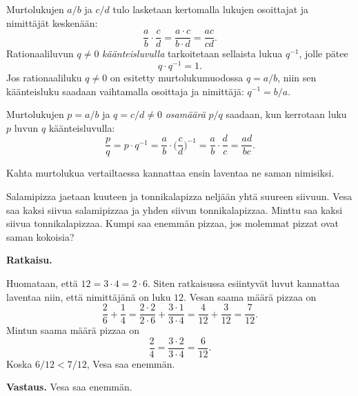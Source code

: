 Murtolukujen $a/b$ ja $c/d$ tulo lasketaan kertomalla lukujen osoittajat ja nimittäjät keskenään:
\[
\frac{a}{b}\cdot \frac{c}{d} = \frac{a\cdot c}{b\cdot d} = \frac{ac}{cd}.
\]
Rationaaliluvun $q\neq 0$ \emph{käänteisluvulla} tarkoitetaan sellaista lukua $q^{-1}$, jolle pätee
\[
q\cdot q^{-1} = 1.
\]
Jos rationaaliluku $q\neq 0$ on esitetty murtolukumuodossa $q=a/b$, niin sen käänteisluku saadaan vaihtamalla osoittaja ja nimittäjä: $q^{-1} = b/a$.

Murtolukujen $p=a/b$ ja $q=c/d\neq 0$ \emph{osamäärä} $p/q$ saadaan, kun kerrotaan luku $p$ luvun $q$ käänteisluvulla:
\[
\frac{p}{q} = p\cdot q^{-1} = \frac{a}{b}\cdot\Big(\frac{c}{d}\Big)^{-1} = \frac{a}{b}\cdot \frac{d}{c}
= \frac{ad}{bc}.
\]




Kahta murtolukua vertailtaessa kannattaa ensin laventaa ne saman nimisiksi.

\begin{esimerkki}
Salamipizza jaetaan kuuteen ja tonnikalapizza neljään yhtä suureen siivuun. Vesa saa kaksi siivua salamipizzaa ja yhden siivun tonnikalapizzaa. Minttu saa kaksi siivua tonnikalapizzaa. Kumpi saa enemmän pizzaa, jos molemmat pizzat ovat saman kokoisia?

{\bf Ratkaisu.}

Huomataan, että $12 = 3\cdot 4 = 2\cdot 6$. Siten ratkaisussa esiintyvät luvut kannattaa laventaa niin, että nimittäjänä on luku $12$. Vesan saama määrä pizzaa on
\[
\frac{2}{6} + \frac{1}{4} = \frac{2\cdot 2}{2\cdot 6} + \frac{3\cdot 1}{3\cdot 4} 
=\frac{4}{12}+\frac{3}{12} = \frac{7}{12}.
\]
Mintun saama määrä pizzaa on
\[
\frac{2}{4} = \frac{3\cdot 2}{3\cdot 4} = \frac{6}{12}.
\]
Koska $6/12 < 7/12$, Vesa saa enemmän.

{\bf Vastaus.} Vesa saa enemmän.
\end{esimerkki}


